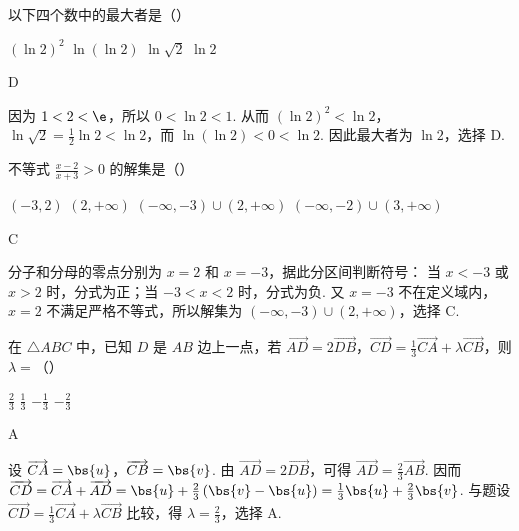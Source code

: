 \begin{problem}
以下四个数中的最大者是（\quad）

\choices
    {\((\ln 2)^2\)}
    {\(\ln\left(\ln 2\right)\)}
    {\(\ln\sqrt{2}\)}
    {\(\ln 2\)}
\end{problem}

\begin{answer}
D
\end{answer}

\begin{solution}
因为 \(1<2<\e\)，所以 \(0<\ln 2<1\). 从而
\((\ln 2)^2<\ln 2\)，\(\ln\sqrt{2}=\frac12\ln 2<\ln 2\)，而
\(\ln(\ln 2)<0<\ln 2\). 因此最大者为 \(\ln 2\)，选择 D.
\end{solution}

\begin{problem}
不等式 \(\frac{x-2}{x+3}>0\) 的解集是（\quad）

\choices
    {\(\left(-3,2\right)\)}
    {\(\left(2,+\infty\right)\)}
    {\(\left(-\infty,-3\right)\cup\left(2,+\infty\right)\)}
    {\(\left(-\infty,-2\right)\cup\left(3,+\infty\right)\)}
\end{problem}

\begin{answer}
C
\end{answer}

\begin{solution}
分子和分母的零点分别为 \(x=2\) 和 \(x=-3\)，据此分区间判断符号：
当 \(x<-3\) 或 \(x>2\) 时，分式为正；当 \(-3<x<2\) 时，分式为负.
又 \(x=-3\) 不在定义域内，\(x=2\) 不满足严格不等式，所以解集为
\(\left(-\infty,-3\right)\cup\left(2,+\infty\right)\)，选择 C.
\end{solution}

\begin{problem}
在 \(\triangle ABC\) 中，已知 \(D\) 是 \(AB\) 边上一点，若 \(\overrightarrow{AD}=2\overrightarrow{DB}\)，\(\overrightarrow{CD}=\frac{1}{3}\overrightarrow{CA}+\lambda\overrightarrow{CB}\)，则 \(\lambda=\)（\quad）

\choices
    {\(\frac{2}{3}\)}
    {\(\frac{1}{3}\)}
    {\(-\frac{1}{3}\)}
    {\(-\frac{2}{3}\)}
\end{problem}

\begin{answer}
A
\end{answer}

\begin{solution}
设 \(\overrightarrow{CA}=\bs{u}\)，\(\overrightarrow{CB}=\bs{v}\). 由
\(\overrightarrow{AD}=2\overrightarrow{DB}\)，可得
\(\overrightarrow{AD}=\frac23\overrightarrow{AB}\). 因而
\(\overrightarrow{CD}=\overrightarrow{CA}+\overrightarrow{AD}
=\bs{u}+\frac23\left(\bs{v}-\bs{u}\right)
=\frac13\bs{u}+\frac23\bs{v}\).
与题设 \(\overrightarrow{CD}=\frac13\overrightarrow{CA}+\lambda\overrightarrow{CB}\) 比较，得
\(\lambda=\frac23\)，选择 A.
\end{solution}

